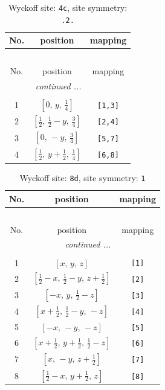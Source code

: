 \documentclass[fleqn,8pt]{jsarticle}
\begin{document}
\renewcommand{\arraystretch}{1.2}
\begin{longtable}{ccc}
\caption{Wyckoff site: {\tt 4c}, site symmetry: {\tt .2.}}
 \\
 \hline \hline
No. & position & mapping \\ \hline \endfirsthead

\multicolumn{2}{l}{\tablename\ \thetable{}} \\
 \hline \hline
No. & position & mapping \\ \hline \endhead

 \hline \hline
\multicolumn{2}{r}{\footnotesize\it continued ...} \\ \endfoot

 \hline \hline
\multicolumn{2}{r}{} \\ \endlastfoot

1 & $\left[ 0,\, y,\, \frac{1}{4} \right]$ & {\tt [1,3]} \\ \hline
2 & $\left[ \frac{1}{2},\, \frac{1}{2} - y,\, \frac{3}{4} \right]$ & {\tt [2,4]} \\ \hline
3 & $\left[ 0,\, - y,\, \frac{3}{4} \right]$ & {\tt [5,7]} \\ \hline
4 & $\left[ \frac{1}{2},\, y + \frac{1}{2},\, \frac{1}{4} \right]$ & {\tt [6,8]} \\
\end{longtable}
\renewcommand{\arraystretch}{1.2}
\begin{longtable}{ccc}
\caption{Wyckoff site: {\tt 8d}, site symmetry: {\tt 1}}
 \\
 \hline \hline
No. & position & mapping \\ \hline \endfirsthead

\multicolumn{2}{l}{\tablename\ \thetable{}} \\
 \hline \hline
No. & position & mapping \\ \hline \endhead

 \hline \hline
\multicolumn{2}{r}{\footnotesize\it continued ...} \\ \endfoot

 \hline \hline
\multicolumn{2}{r}{} \\ \endlastfoot

1 & $\left[ x,\, y,\, z \right]$ & {\tt [1]} \\ \hline
2 & $\left[ \frac{1}{2} - x,\, \frac{1}{2} - y,\, z + \frac{1}{2} \right]$ & {\tt [2]} \\ \hline
3 & $\left[ - x,\, y,\, \frac{1}{2} - z \right]$ & {\tt [3]} \\ \hline
4 & $\left[ x + \frac{1}{2},\, \frac{1}{2} - y,\, - z \right]$ & {\tt [4]} \\ \hline
5 & $\left[ - x,\, - y,\, - z \right]$ & {\tt [5]} \\ \hline
6 & $\left[ x + \frac{1}{2},\, y + \frac{1}{2},\, \frac{1}{2} - z \right]$ & {\tt [6]} \\ \hline
7 & $\left[ x,\, - y,\, z + \frac{1}{2} \right]$ & {\tt [7]} \\ \hline
8 & $\left[ \frac{1}{2} - x,\, y + \frac{1}{2},\, z \right]$ & {\tt [8]} \\
\end{longtable}
\end{document}
